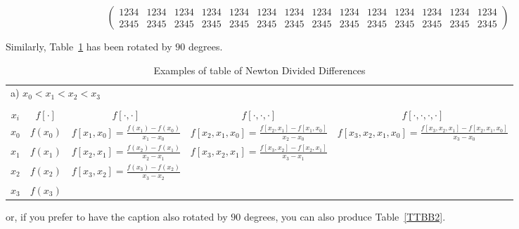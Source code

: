 \begin{sideways}
\parbox{20cm}{
\[
\left( 
\begin{array}{cccccccccccccc}
1234 & 1234 &1234 &1234 &1234 &1234 &1234 &1234 &1234 &1234 &1234 &1234 &1234
&1234 \\
2345 & 2345 &2345 &2345 &2345 &2345 &2345 &2345 &2345 &2345 &2345 &2345 &2345
&2345
\end{array}
\right)
\]
}
\end{sideways}

Similarly, Table~\ref{TTBB1} has been rotated by $90$ degrees.

\begin{table}
\begin{sideways}
\begin{tabular}{ccccc}
\multicolumn{5}{l}{a) $x_0 < x_1 <x_2 < x_3$} \\
&&&&\\
$\displaystyle x_i$ & $\displaystyle f[\cdot] $ &
$\displaystyle f[\cdot,\cdot]$ &
$\displaystyle f[\cdot,\cdot,\cdot]$ &
$\displaystyle f[\cdot,\cdot,\cdot,\cdot]$ \\
\hline
\rule{0em}{2em} $\displaystyle x_0$ & \multicolumn{1}{|c}{$\displaystyle
  f(x_0)$} &
\multicolumn{1}{|c}{$\displaystyle f[x_1,x_0] =
  \frac{f(x_1)-f(x_0)}{x_1-x_0}$} &
\multicolumn{1}{|c}{$\displaystyle
  f[x_2,x_1,x_0]=\frac{f[x_2,x_1]-f[x_1,x_0]}{x_2-x_0}$} &
\multicolumn{1}{|c|}{$\displaystyle f[x_3,x_2,x_1,x_0] =
\frac{f[x_3,x_2,x_1]-f[x_2,x_1,x_0]}{x_3-x_0}$} \\[1em]
\cline{2-5}
\rule{0em}{2em} $\displaystyle x_1$ & $\displaystyle f(x_1)$ &
$\displaystyle f[x_2,x_1] = \frac{f(x_2)-f(x_1)}{x_2-x_1}$ &
$\displaystyle f[x_3,x_2,x_1] = \frac{f[x_3,x_2]-f[x_2,x_1]}{x_3-x_1}$
& \\[1em]
\rule{0em}{2em} $\displaystyle x_2$ & $\displaystyle f(x_2)$ &
$\displaystyle f[x_3,x_2] = \frac{f(x_3)-f(x_2)}{x_3-x_2}$ & & \\[1em]
$\displaystyle x_3$ & $\displaystyle f(x_3)$ & & &
\end{tabular}
\end{sideways}
\caption{Examples of table of Newton Divided Differences\label{TTBB1}}
\end{table}

or, if you prefer to have the caption also rotated by $90$ degrees, you can
also produce Table~\ref{TTBB2}.

